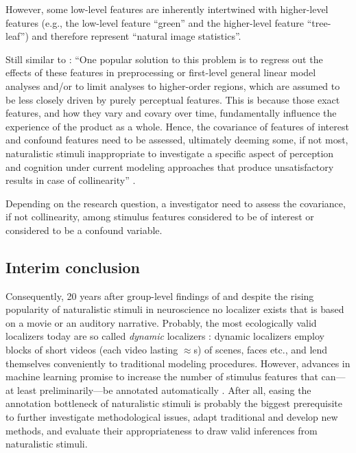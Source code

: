 %
However, some low-level features are inherently intertwined with higher-level
features (e.g., the low-level feature ``green'' and the higher-level feature
``tree-leaf'') and therefore represent ``natural image statistics''.

%
Still similar to \citet{grall2022leveraging}: ``One popular solution to this
problem is to regress out the effects of these features in preprocessing or
first-level general linear model analyses and/or to limit analyses to
higher-order regions, which are assumed to be less closely driven by purely
perceptual features.
%
This is because those exact features, and how they vary and covary over time,
fundamentally influence the experience of the product as a whole.
%
Hence, the covariance of features of interest and confound features need to be
assessed, ultimately deeming some, if not most, naturalistic stimuli
inappropriate to investigate a specific aspect of perception and cognition under
current modeling approaches that produce unsatisfactory results in case of
collinearity'' \citep{grall2022leveraging}.

%
Depending on the research question, a investigator need to assess the
covariance, if not collinearity, among stimulus features considered to be of
interest or considered to be a confound variable.


\subsection{Interim conclusion}


%
Consequently, 20 years after group-level findings of \citep{bartels2004mapping}
and despite the rising popularity of naturalistic stimuli in neuroscience no
localizer exists that is based on a movie or an auditory narrative.
%
Probably, the most ecologically valid localizers today are so called
\textit{dynamic} localizers \citep[e.g.,][]{pitcher2011differential,
fox2009defining}:
%
dynamic localizers employ blocks of short videos (each video lasting
$\approx$\unit[2-3]{s}) of scenes, faces etc., and lend themselves conveniently
to traditional modeling procedures.
%
However, advances in machine learning promise to increase the number of stimulus
features that can---at least preliminarily---be annotated automatically
\citep[cf. the toolsbox ``pliers'' that is implemented in the platform
\href{https://neuroscout.org/}{\url{neuroscout.org}}
platform;][]{mcnamara2017developing, delavega2022neuroscout}.
%
After all, easing the annotation bottleneck of naturalistic stimuli is probably
the biggest prerequisite to further investigate methodological issues, adapt
traditional and develop new methods, and evaluate their appropriateness to draw
valid inferences from naturalistic stimuli.


